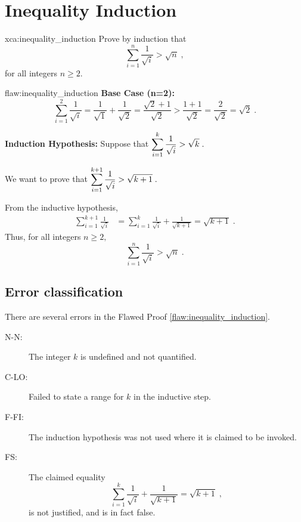 \section{Inequality Induction}

\begin{xca}{xca:inequality_induction}
Prove by induction that 
$$\sum_{i=1}^n \frac{1}{\sqrt{i}} > \sqrt{n}\;,$$
for all integers $n \geq 2.$
\end{xca}

\begin{flaw}{flaw:inequality_induction} 
\textbf{Base Case (n=2):} 
$$\sum_{i=1}^2 \frac{1}{\sqrt{i}} = \frac{1}{\sqrt{1}} + \frac{1}{\sqrt{2}} = \frac{\sqrt{2}+1}{\sqrt{2}} >  \frac{1 + 1}{\sqrt{2}} = \frac{2}{\sqrt{2}} = \sqrt{2}\;.$$ 

\noindent \textbf{Induction Hypothesis:} Suppose that 
$\displaystyle \sum_{i=1}^k \frac{1}{\sqrt{i}} > \sqrt{k}\;.$

\noindent We want to prove that 
$\displaystyle \sum_{i=1}^{k+1} \frac{1}{\sqrt{i}} > \sqrt{k+1}\;.$

\noindent From the inductive hypothesis,
\begin{align*}
    \sum_{i=1}^{k+1} \frac{1}{\sqrt{i}} &= \sum_{i=1}^{k} \frac{1}{\sqrt{i}} + \frac{1}{\sqrt{k+1}} = \sqrt{k+1}\;.
\end{align*}
Thus, for all integers $n \geq 2,$
$$\sum_{i=1}^n \frac{1}{\sqrt{i}} > \sqrt{n}\;.$$
\end{flaw}

\clearpage
\subsection{Error classification}

There are several errors
 in the Flawed Proof \ref{flaw:inequality_induction}. 

 
 \begin{description}
 	\item[N-N:] The integer $k$ is undefined and not quantified. 
 	\item[C-LO:] Failed to state a range for $k$ in the inductive step. 
 	\item[F-FI:] The induction hypothesis was not used where it is claimed to be invoked.
 	\item[FS:] The claimed equality $$\sum_{i=1}^{k} \frac{1}{\sqrt{i}} + \frac{1}{\sqrt{k+1}}
    = \sqrt{k+1}\;,$$
    is not justified, and is in fact false.
 \end{description}

